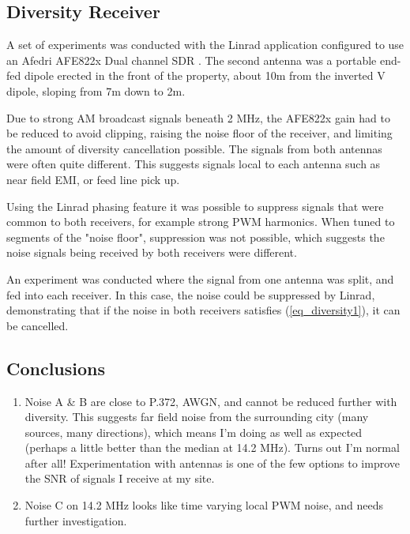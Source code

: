 \documentclass{article}
\begin{document}
\subsection{Diversity Receiver}

A set of experiments was conducted with the Linrad application \cite{linrad_home} configured to use an Afedri AFE822x Dual channel SDR \cite{afedri_dual}.  The second antenna was a portable end-fed dipole erected in the front of the property, about 10m from the inverted V dipole, sloping from 7m down to 2m.

Due to strong AM broadcast signals beneath 2 MHz, the AFE822x gain had to be reduced to avoid clipping, raising the noise floor of the receiver, and limiting the amount of diversity cancellation possible. The signals from both antennas were often quite different.  This suggests signals local to each antenna such as near field EMI, or feed line pick up.

Using the Linrad phasing feature \cite{linrad_phasing} it was possible to suppress signals that were common to both receivers, for example strong PWM harmonics.  When tuned to segments of the "noise floor", suppression was not possible, which suggests the noise signals being received by both receivers were different.

An experiment was conducted where the signal from one antenna was split, and fed into each receiver.  In this case, the noise could be suppressed by Linrad, demonstrating that if the noise in both receivers satisfies (\ref{eq_diversity1}), it can be cancelled.

\subsection{Conclusions}

\begin{enumerate}
\item Noise A \& B are close to P.372, AWGN, and cannot be reduced further with diversity.  This suggests far field noise from the surrounding city (many sources, many directions), which means I'm doing as well as expected (perhaps a little better than the median at 14.2 MHz).  Turns out I'm normal after all!  Experimentation with antennas is one of the few options to improve the SNR of signals I receive at my site. 
\item Noise C on 14.2 MHz looks like time varying local PWM noise, and needs further investigation.
\end{enumerate}
\end{document}

